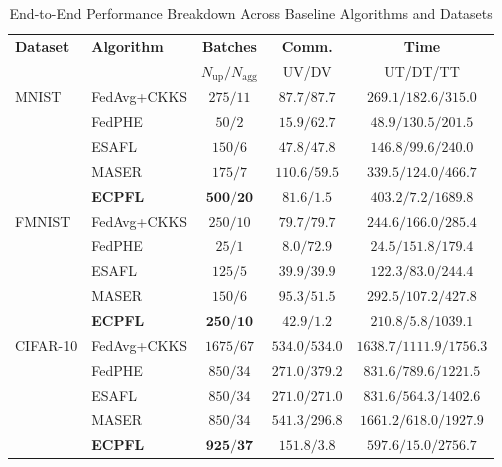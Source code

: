 \begin{table}[t]
\centering
\caption{End-to-End Performance Breakdown Across Baseline Algorithms and Datasets}
\label{tab:perf_evaluation}
\scriptsize
\setlength{\tabcolsep}{0.8pt}
\begin{tabular}{@{}llccc@{}}
\toprule
\textbf{Dataset} & \textbf{Algorithm} & \textbf{Batches} & \textbf{Comm.} & \textbf{Time} \\
& & \scriptsize $N_{\mathrm{up}}/N_{\mathrm{agg}}$ & \scriptsize UV/DV & \scriptsize UT/DT/TT \\
\midrule

MNIST & FedAvg+CKKS & $275/11$ & $87.7/87.7$ & $269.1/182.6/315.0$ \\
& FedPHE      & $50/2$   & $15.9/62.7$ & $48.9/130.5/201.5$ \\
& ESAFL       & $150/6$ & $47.8/47.8$ & $146.8/99.6/240.0$ \\
& MASER       & $175/7$ & $110.6/59.5$ & $339.5/124.0/466.7$ \\
\rowcolor{gray!15}
& \textbf{ECPFL} & $\mathbf{500}/\mathbf{20}$ & $\mathbf{81.6}/\mathbf{1.5}$ & $\mathbf{403.2}/\mathbf{7.2}/\mathbf{1689.8}$ \\
\midrule

FMNIST & FedAvg+CKKS & $250/10$ & $79.7/79.7$ & $244.6/166.0/285.4$ \\
& FedPHE      & $25/1$   & $8.0/72.9$  & $24.5/151.8/179.4$ \\
& ESAFL       & $125/5$ & $39.9/39.9$ & $122.3/83.0/244.4$ \\
& MASER       & $150/6$ & $95.3/51.5$ & $292.5/107.2/427.8$ \\
\rowcolor{gray!15}
& \textbf{ECPFL} & $\mathbf{250}/\mathbf{10}$ & $\mathbf{42.9}/\mathbf{1.2}$ & $\mathbf{210.8}/\mathbf{5.8}/\mathbf{1039.1}$ \\
\midrule

CIFAR-10 & FedAvg+CKKS & $1675/67$ & $534.0/534.0$ & $1638.7/1111.9/1756.3$ \\
& FedPHE      & $850/34$   & $271.0/379.2$ & $831.6/789.6/1221.5$ \\
& ESAFL       & $850/34$   & $271.0/271.0$ & $831.6/564.3/1402.6$ \\
& MASER       & $850/34$   & $541.3/296.8$ & $1661.2/618.0/1927.9$ \\
\rowcolor{gray!15}
& \textbf{ECPFL} & $\mathbf{925}/\mathbf{37}$ & $\mathbf{151.8}/\mathbf{3.8}$ & $\mathbf{597.6}/\mathbf{15.0}/\mathbf{2756.7}$ \\
\midrule


\end{tabular}
\end{table}
